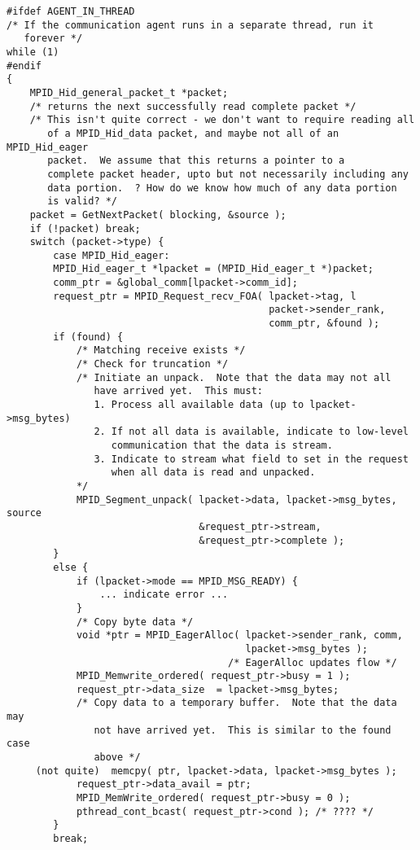 \begin{verbatim}
#ifdef AGENT_IN_THREAD
/* If the communication agent runs in a separate thread, run it
   forever */
while (1) 
#endif
{
    MPID_Hid_general_packet_t *packet;
    /* returns the next successfully read complete packet */
    /* This isn't quite correct - we don't want to require reading all
       of a MPID_Hid_data packet, and maybe not all of an MPID_Hid_eager
       packet.  We assume that this returns a pointer to a 
       complete packet header, upto but not necessarily including any
       data portion.  ? How do we know how much of any data portion 
       is valid? */
    packet = GetNextPacket( blocking, &source );
    if (!packet) break;
    switch (packet->type) {
        case MPID_Hid_eager:
        MPID_Hid_eager_t *lpacket = (MPID_Hid_eager_t *)packet;
        comm_ptr = &global_comm[lpacket->comm_id];
        request_ptr = MPID_Request_recv_FOA( lpacket->tag, l
                                             packet->sender_rank, 
                                             comm_ptr, &found );
        if (found) {
            /* Matching receive exists */
            /* Check for truncation */
            /* Initiate an unpack.  Note that the data may not all 
               have arrived yet.  This must:
               1. Process all available data (up to lpacket->msg_bytes)
               2. If not all data is available, indicate to low-level
                  communication that the data is stream.
               3. Indicate to stream what field to set in the request
                  when all data is read and unpacked.
            */
            MPID_Segment_unpack( lpacket->data, lpacket->msg_bytes, source
                                 &request_ptr->stream, 
                                 &request_ptr->complete );
        }
        else {
            if (lpacket->mode == MPID_MSG_READY) {
                ... indicate error ...
            }
            /* Copy byte data */
            void *ptr = MPID_EagerAlloc( lpacket->sender_rank, comm, 
                                         lpacket->msg_bytes );
                                      /* EagerAlloc updates flow */
            MPID_Memwrite_ordered( request_ptr->busy = 1 );
            request_ptr->data_size  = lpacket->msg_bytes;
            /* Copy data to a temporary buffer.  Note that the data may
               not have arrived yet.  This is similar to the found case
               above */
     (not quite)  memcpy( ptr, lpacket->data, lpacket->msg_bytes );
            request_ptr->data_avail = ptr;
            MPID_MemWrite_ordered( request_ptr->busy = 0 );
            pthread_cont_bcast( request_ptr->cond ); /* ???? */
        }
        break;


\end{verbatim}
